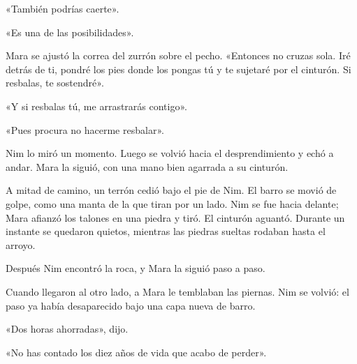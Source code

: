 \documentclass[10pt,a4paper]{article}
\begin{document}
«También podrías caerte».

«Es una de las posibilidades».

Mara se ajustó la correa del zurrón sobre el pecho. «Entonces no cruzas sola. Iré detrás de ti, pondré los pies donde los pongas tú y te sujetaré por el cinturón. Si resbalas, te sostendré».

«Y si resbalas tú, me arrastrarás contigo».

«Pues procura no hacerme resbalar».

Nim lo miró un momento. Luego se volvió hacia el desprendimiento y echó a andar. Mara la siguió, con una mano bien agarrada a su cinturón.

A mitad de camino, un terrón cedió bajo el pie de Nim. El barro se movió de golpe, como una manta de la que tiran por un lado. Nim se fue hacia delante; Mara afianzó los talones en una piedra y tiró. El cinturón aguantó. Durante un instante se quedaron quietos, mientras las piedras sueltas rodaban hasta el arroyo.

Después Nim encontró la roca, y Mara la siguió paso a paso.

Cuando llegaron al otro lado, a Mara le temblaban las piernas. Nim se volvió: el paso ya había desaparecido bajo una capa nueva de barro.

«Dos horas ahorradas», dijo.

«No has contado los diez años de vida que acabo de perder».
\end{document}
